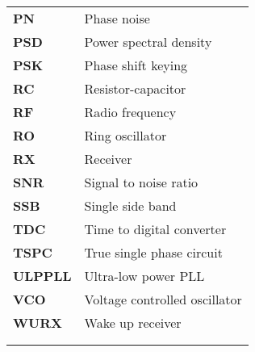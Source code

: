 \begin{tabular}{@{}ll}
		\textbf{\textsf{PN}} &  Phase noise	\\
		\textbf{\textsf{PSD}} & Power spectral density	\\
		\textbf{\textsf{PSK}} & Phase shift keying 	\\
		\textbf{\textsf{RC}} &  Resistor-capacitor	\\
		\textbf{\textsf{RF}} &  Radio frequency	\\
		\textbf{\textsf{RO}}& 	Ring oscillator\\
		\textbf{\textsf{RX}}& 	Receiver\\
		\textbf{\textsf{SNR}} & Signal to noise ratio 	\\
		\textbf{\textsf{SSB}}& 	Single side band\\
		\textbf{\textsf{TDC}}& 	Time to digital converter \\
		\textbf{\textsf{TSPC}}& 	True single phase circuit\\
		\textbf{\textsf{ULPPLL}} & Ultra-low power PLL 	\\
		\textbf{\textsf{VCO}}& 	Voltage controlled oscillator\\
		\textbf{\textsf{WURX}}& 	Wake up receiver\\
		& 	\\
		& 	\\
	\end{tabular}
